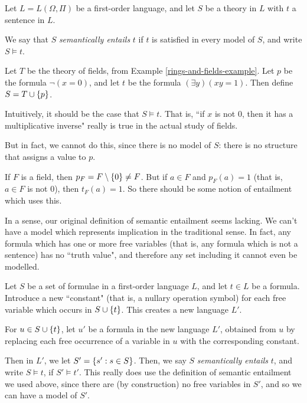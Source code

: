 \documentclass{article}
\begin{document}
\begin{definition}
    Let $L = L(\Omega, \Pi)$ be a first-order language, and let $S$ be a theory in $L$ with $t$ a sentence in $L$.
    
    We say that $S$ \textit{semantically entails} $t$ if $t$ is satisfied in every model of $S$, and write $S \vDash t$.
\end{definition}

\begin{example}
    Let $T$ be the theory of fields, from Example \ref{rings-and-fields-example}.
    Let $p$ be the formula $\lnot (x = 0)$, and let $t$ be the formula $(\exists y)(xy=1)$.
    Then define $S = T \cup \left\lbrace p \right\rbrace$.
    
    Intuitively, it should be the case that $S \vDash t$.
    That is, ``if $x$ is not 0, then it has a multiplicative inverse" really is true in the actual study of fields.
    
    But in fact, we cannot do this, since there is no model of $S$: there is no structure that assigns a value to $p$.
    
    If $F$ is a field, then $p_F = F \setminus \left\lbrace 0 \right\rbrace \neq F$.
    But if $a \in F$ and $p_F(a) = 1$ (that is, $a \in F$ is not 0), then $t_F(a) = 1$.
    So there should be some notion of entailment which uses this.
\end{example}

In a sense, our original definition of semantic entailment seems lacking. We can't have a model which represents implication in the traditional sense. In fact, any formula which has one or more free variables (that is, any formula which is not a sentence) has no ``truth value", and therefore any set including it cannot even be modelled.

\begin{definition}
	\label{first-order-semantic-entailment}
    Let $S$ be a set of formulae in a first-order language $L$, and let $t \in L$ be a formula. Introduce a new ``constant" (that is, a nullary operation symbol) for each free variable which occurs in $S \cup \left\lbrace t \right\rbrace$. This creates a new language $L'$.
    
    For $u \in S \cup \left\lbrace t \right\rbrace$, let $u'$ be a formula in the new language $L'$, obtained from $u$ by replacing each free occurrence of a variable in $u$ with the corresponding constant.
    
    Then in $L'$, we let $S' = \left\lbrace s' : s \in S \right\rbrace$. Then, we say $S$ \textit{semantically entails} $t$, and write $S \vDash t$, if $S' \vDash t'$.
    This really does use the definition of semantic entailment we used above, since there are (by construction) no free variables in $S'$, and so we can have a model of $S'$.
\end{definition}
\end{document}
